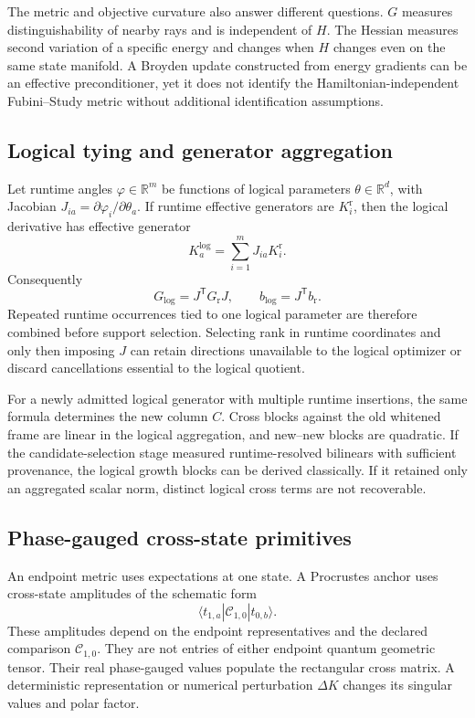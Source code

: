 \documentclass[10pt,twocolumn]{article}
\theoremstyle{definition}
\theoremstyle{remark}
\newcommand{\R}{\mathbb R}
\newcommand{\rt}{\mathrm r}
\begin{document}
The metric and objective curvature also answer different questions.
$G$ measures distinguishability of nearby rays and is independent of $H$.
The Hessian measures second variation of a specific energy and changes when
$H$ changes even on the same state manifold.  A Broyden update constructed
from energy gradients can be an effective preconditioner, yet it does not
identify the Hamiltonian-independent Fubini--Study metric without additional
identification assumptions.

\subsection{Logical tying and generator aggregation}

Let runtime angles $\varphi\in\R^m$ be functions of logical parameters
$\theta\in\R^d$, with Jacobian $J_{ia}=\partial\varphi_i/\partial\theta_a$.
If runtime effective generators are $K_i^{\rt}$, then the logical derivative
has effective generator
\begin{equation}
 K_a^{\log}=\sum_{i=1}^mJ_{ia}K_i^{\rt}.
 \label{eq:applogicalgenerator}
\end{equation}
Consequently
\begin{equation}
 G_{\log}=J^{\mathsf T}G_{\rt}J,\qquad
 b_{\log}=J^{\mathsf T}b_{\rt}.
 \label{eq:applogicalblocks}
\end{equation}
Repeated runtime occurrences tied to one logical parameter are therefore
combined before support selection.  Selecting rank in runtime coordinates
and only then imposing $J$ can retain directions unavailable to the logical
optimizer or discard cancellations essential to the logical quotient.

For a newly admitted logical generator with multiple runtime insertions, the
same formula determines the new column $C$.  Cross blocks against the old
whitened frame are linear in the logical aggregation, and new--new blocks are
quadratic.  If the candidate-selection stage measured runtime-resolved
bilinears with sufficient provenance, the logical growth blocks can be
derived classically.  If it retained only an aggregated scalar norm, distinct
logical cross terms are not recoverable.

\subsection{Phase-gauged cross-state primitives}

An endpoint metric uses expectations at one state.  A Procrustes anchor uses
cross-state amplitudes of the schematic form
\begin{equation}
 \langle t_{1,a}|\mathcal C_{1,0}|t_{0,b}\rangle .
 \label{eq:appcrossprimitive}
\end{equation}
These amplitudes depend on the endpoint representatives and the declared
comparison $\mathcal C_{1,0}$.  They are not entries of either endpoint
quantum geometric tensor.  Their real phase-gauged values populate the
rectangular cross matrix.  A deterministic representation or numerical
perturbation $\Delta K$ changes its singular values and polar factor.
\end{document}
